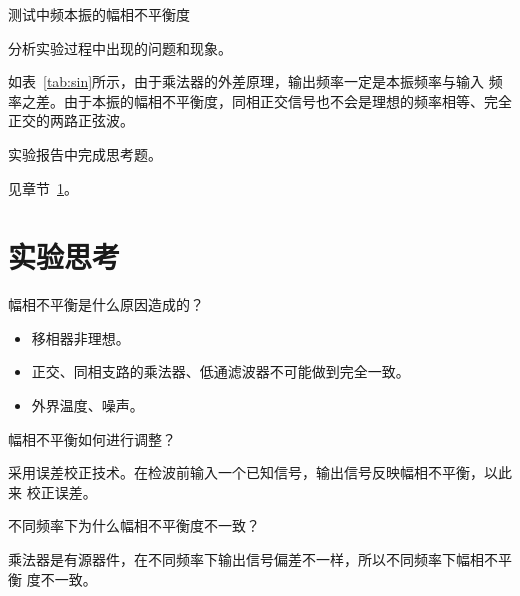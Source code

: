 \documentclass[../main]{subfiles}
\begin{document}
\begin{table}[htbp]
  \centering
  \caption{测试中频本振的幅相不平衡度}%
  \label{tab:phase}
\end{table}


\begin{Exercise}
  分析实验过程中出现的问题和现象。
\end{Exercise}

\begin{Answer}
  如表~\ref{tab:sin}所示，由于乘法器的外差原理，输出频率一定是本振频率与输入
  频率之差。由于本振的幅相不平衡度，同相正交信号也不会是理想的频率相等、完全
  正交的两路正弦波。
\end{Answer}

\begin{Exercise}
  实验报告中完成思考题。
\end{Exercise}

\begin{Answer}
  见章节~\ref{sec:\arabic{chapter}thought}。
\end{Answer}

\section{实验思考}%
\label{sec:\arabic{chapter}thought}

\begin{Exercise}
  幅相不平衡是什么原因造成的？
\end{Exercise}

\begin{Answer}
  \begin{itemize}
    \item 移相器非理想。
    \item 正交、同相支路的乘法器、低通滤波器不可能做到完全一致。
    \item 外界温度、噪声。
  \end{itemize}
\end{Answer}

\begin{Exercise}
  幅相不平衡如何进行调整？
\end{Exercise}

\begin{Answer}
  采用误差校正技术。在检波前输入一个已知信号，输出信号反映幅相不平衡，以此来
  校正误差。
\end{Answer}

\begin{Exercise}
  不同频率下为什么幅相不平衡度不一致？
\end{Exercise}

\begin{Answer}
  乘法器是有源器件，在不同频率下输出信号偏差不一样，所以不同频率下幅相不平衡
  度不一致。
\end{Answer}
\end{document}
